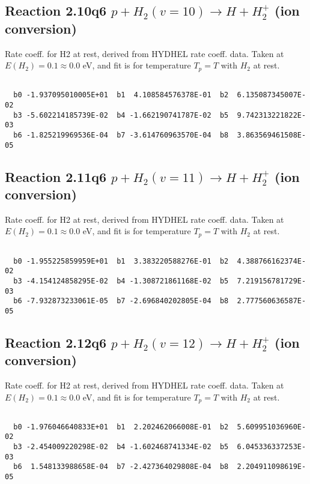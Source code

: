 \newpage
\subsection{
Reaction 2.10q6
$ p + H_2(v=10) \rightarrow H + H_2^+$ (ion conversion)
}
Rate coeff. for H2 at rest, derived from HYDHEL rate coeff. data.
Taken at $E(H_2) = 0.1 \approx 0.0$ eV,  and fit is for temperature $T_p=T$ with $H_2$ at rest.

\begin{small}\begin{verbatim}

  b0 -1.937095010005E+01  b1  4.108584576378E-01  b2  6.135087345007E-02
  b3 -5.602214185739E-02  b4 -1.662190741787E-02  b5  9.742313221822E-03
  b6 -1.825219969536E-04  b7 -3.614760963570E-04  b8  3.863569461508E-05

\end{verbatim}\end{small}

\newpage
\subsection{
Reaction 2.11q6
$ p + H_2(v=11) \rightarrow H + H_2^+$ (ion conversion)
}
Rate coeff. for H2 at rest, derived from HYDHEL rate coeff. data.
Taken at $E(H_2) = 0.1 \approx 0.0$ eV,  and fit is for temperature $T_p=T$ with $H_2$ at rest.

\begin{small}\begin{verbatim}

  b0 -1.955225859959E+01  b1  3.383220588276E-01  b2  4.388766162374E-02
  b3 -4.154124858295E-02  b4 -1.308721861168E-02  b5  7.219156781729E-03
  b6 -7.932873233061E-05  b7 -2.696840202805E-04  b8  2.777560636587E-05

\end{verbatim}\end{small}

\newpage
\subsection{
Reaction 2.12q6
$ p + H_2(v=12) \rightarrow H + H_2^+$ (ion conversion)
}
Rate coeff. for H2 at rest, derived from HYDHEL rate coeff. data.
Taken at $E(H_2) = 0.1 \approx 0.0$ eV,  and fit is for temperature $T_p=T$ with $H_2$ at rest.

\begin{small}\begin{verbatim}

  b0 -1.976046640833E+01  b1  2.202462066008E-01  b2  5.609951036960E-02
  b3 -2.454009220298E-02  b4 -1.602468741334E-02  b5  6.045336337253E-03
  b6  1.548133988658E-04  b7 -2.427364029808E-04  b8  2.204911098619E-05

\end{verbatim}\end{small}

